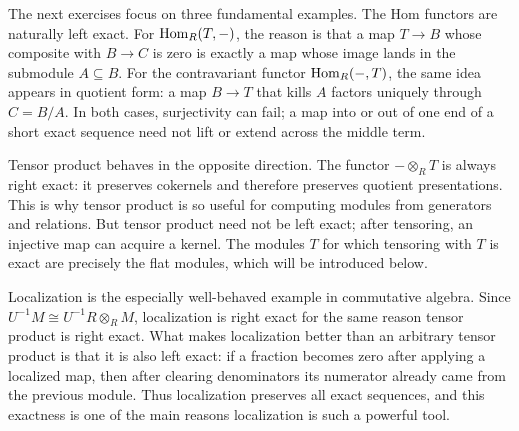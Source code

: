 \documentclass[12pt,reqno]{amsart}
\begin{document}
The next exercises focus on three fundamental examples. The Hom functors are naturally left exact. For $\operatorname{Hom}_R(T,-)$, the reason is that a map $T\to B$ whose composite with $B\to C$ is zero is exactly a map whose image lands in the submodule $A\subseteq B$. For the contravariant functor $\operatorname{Hom}_R(-,T)$, the same idea appears in quotient form: a map $B\to T$ that kills $A$ factors uniquely through $C=B/A$. In both cases, surjectivity can fail; a map into or out of one end of a short exact sequence need not lift or extend across the middle term.

Tensor product behaves in the opposite direction. The functor $-\otimes_R T$ is always right exact: it preserves cokernels and therefore preserves quotient presentations. This is why tensor product is so useful for computing modules from generators and relations. But tensor product need not be left exact; after tensoring, an injective map can acquire a kernel. The modules $T$ for which tensoring with $T$ is exact are precisely the flat modules, which will be introduced below.

Localization is the especially well-behaved example in commutative algebra. Since $U^{-1}M\cong U^{-1}R\otimes_R M$, localization is right exact for the same reason tensor product is right exact. What makes localization better than an arbitrary tensor product is that it is also left exact: if a fraction becomes zero after applying a localized map, then after clearing denominators its numerator already came from the previous module. Thus localization preserves all exact sequences, and this exactness is one of the main reasons localization is such a powerful tool.


\hrulefill
\end{document}
